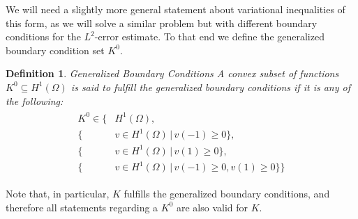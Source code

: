\documentclass[headsepline,footsepline,footinclude=false,oneside,fontsize=11pt,paper=a4,listof=totoc,bibliography=totoc]{scrbook} %
\newtheorem{definition}{Definition}
\begin{document}
We will need a slightly more general statement about variational inequalities of this form, as we will solve a similar problem but with different boundary conditions for the $L^2$-error estimate. To that end we define the generalized boundary condition set $K^0$.

\begin{definition} Generalized Boundary Conditions \newline
	A convex subset of functions $K^0 \subseteq H^1(\Omega)$ is said to fulfill the generalized boundary conditions if it is any of the following:
	\begin{align}
	\begin{split} \label{eq:generalized_boundary_condition_set}
	K^0 \in \big\{ &H^1(\Omega), \\
	\{ &v\in H^1(\Omega) \,|\, v(-1) \geq 0\}, \\
	\{ &v\in H^1(\Omega) \,|\, v(1) \geq 0 \}, \\
	\{ &v\in H^1(\Omega) \,|\, v(-1) \geq 0, v(1) \geq 0\}
	\big\}
	\end{split}
	\end{align}
\end{definition}

Note that, in particular, $K$ fulfills the generalized boundary conditions, and therefore all statements regarding a $K^0$ are also valid for $K$.
\end{document}
